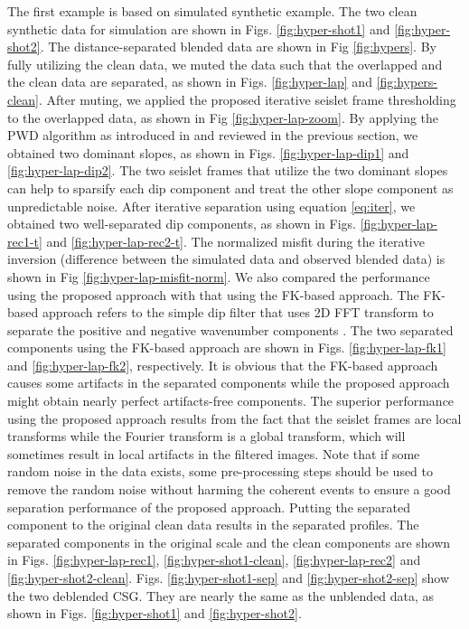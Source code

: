 The first example is based on simulated synthetic example. The two clean synthetic data for simulation are shown in Figs. \ref{fig:hyper-shot1} and \ref{fig:hyper-shot2}. The distance-separated blended data are shown in Fig \ref{fig:hypers}. By fully utilizing the clean data, we muted the data such that the overlapped and the clean data are separated, as shown in Figs. \ref{fig:hyper-lap} and \ref{fig:hypers-clean}. After muting, we applied the proposed iterative seislet frame thresholding to the overlapped data, as shown in Fig \ref{fig:hyper-lap-zoom}. By applying the PWD algorithm as introduced in \cite{fomel2002pwd} and reviewed in the previous section, we obtained two dominant slopes, as shown in Figs. \ref{fig:hyper-lap-dip1} and \ref{fig:hyper-lap-dip2}. The two seislet frames that utilize the two dominant slopes can help to sparsify each dip component and treat the other slope component as unpredictable noise. After iterative separation using equation \ref{eq:iter}, we obtained two well-separated dip components, as shown in Figs. \ref{fig:hyper-lap-rec1-t} and \ref{fig:hyper-lap-rec2-t}. The normalized misfit during the iterative inversion (difference between the simulated data and observed blended data) is shown in Fig \ref{fig:hyper-lap-misfit-norm}. We also compared the performance using the proposed approach with that using the FK-based approach. The FK-based approach refers to the simple dip filter that uses 2D FFT transform \cite{sanyi2015} to separate the positive and negative wavenumber components . The two separated components using the FK-based approach are shown in Figs. \ref{fig:hyper-lap-fk1} and \ref{fig:hyper-lap-fk2}, respectively. It is obvious that the FK-based approach causes some artifacts in the separated components while the proposed approach might obtain nearly perfect artifacts-free components. The superior performance using the proposed approach results from the fact that the seislet frames are local transforms while the Fourier transform is a global transform, which will sometimes result in local artifacts in the filtered images. Note that if some random noise in the data exists, some pre-processing steps should be used to remove the random noise without harming the coherent events \cite{yangkang2015ortho} to ensure a good separation performance of the proposed approach. Putting the separated component to the original clean data results in the separated profiles. The separated components in the original scale and the clean components are shown in Figs. \ref{fig:hyper-lap-rec1}, \ref{fig:hyper-shot1-clean}, \ref{fig:hyper-lap-rec2} and \ref{fig:hyper-shot2-clean}.  Figs. \ref{fig:hyper-shot1-sep} and \ref{fig:hyper-shot2-sep} show the two deblended CSG. They are nearly the same as the unblended data, as shown in Figs. \ref{fig:hyper-shot1} and \ref{fig:hyper-shot2}.


